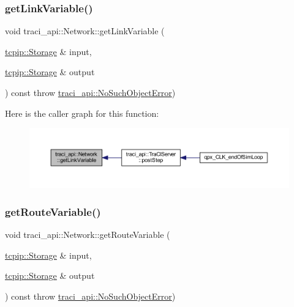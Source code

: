 \subsubsection{\texorpdfstring{get\+Link\+Variable()}{getLinkVariable()}}
{\footnotesize\ttfamily void traci\+\_\+api\+::\+Network\+::get\+Link\+Variable (\begin{DoxyParamCaption}\item[{\hyperlink{classtcpip_1_1_storage}{tcpip\+::\+Storage} \&}]{input,  }\item[{\hyperlink{classtcpip_1_1_storage}{tcpip\+::\+Storage} \&}]{output }\end{DoxyParamCaption}) const throw  \hyperlink{classtraci__api_1_1_no_such_object_error}{traci\+\_\+api\+::\+No\+Such\+Object\+Error}) }

Here is the caller graph for this function\+:
\nopagebreak
\begin{figure}[H]
\begin{center}
\leavevmode
\includegraphics[width=350pt]{classtraci__api_1_1_network_a8a82aa15b0422ce28ca240e88c1af4f7_icgraph}
\end{center}
\end{figure}
\mbox{\label{classtraci__api_1_1_network_abc0574b41332ec15856e2e5bb9926be9}} 
\subsubsection{\texorpdfstring{get\+Route\+Variable()}{getRouteVariable()}}
{\footnotesize\ttfamily void traci\+\_\+api\+::\+Network\+::get\+Route\+Variable (\begin{DoxyParamCaption}\item[{\hyperlink{classtcpip_1_1_storage}{tcpip\+::\+Storage} \&}]{input,  }\item[{\hyperlink{classtcpip_1_1_storage}{tcpip\+::\+Storage} \&}]{output }\end{DoxyParamCaption}) const throw  \hyperlink{classtraci__api_1_1_no_such_object_error}{traci\+\_\+api\+::\+No\+Such\+Object\+Error}) }

